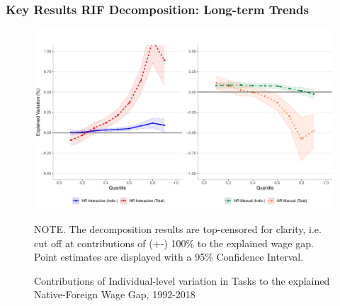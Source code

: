 \documentclass[10pt]{beamer}
\begin{document}
\begin{frame}[label=occ_longterm]
	\frametitle{Key Results RIF Decomposition: Long-term Trends}
	
	
	\begin{figure}[H]
		\begin{minipage}{0.95\textwidth} %
			\centering
			\includegraphics[scale=0.36]{rif_base_nri_nrm} \\
			{\footnotesize \tiny NOTE. \textemdash The decomposition results are top-censored for clarity, i.e. cut off at contributions of (+-) 100\% to the explained wage gap. \\ Point estimates are displayed with a 95\% Confidence Interval. \par}
			\caption{\centering Contributions of Individual-level variation in Tasks to the explained Native-Foreign Wage Gap, 1992-2018 \label{fig:wgap_indiv_occ}}
		\end{minipage}
	\end{figure}
	

\hyperlink{regression}{}	
	
\end{frame}






\end{document}
